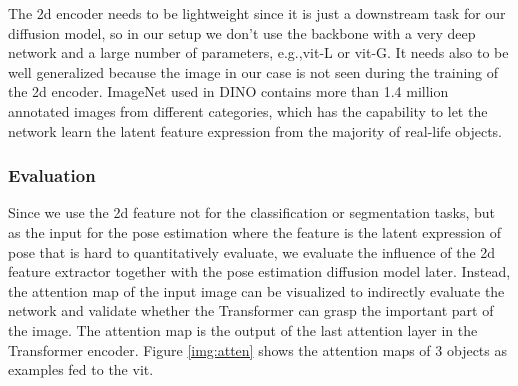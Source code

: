 \documentclass[12pt,DIV14,BCOR12mm,a4paper,footinclude=false,headinclude,parskip=half-,twoside,openright,cleardoublepage=empty,toc=index,bibliography=totoc,listof=totoc]{scrreprt}
\numberwithin{equation}{chapter}
\begin{document}
The \gls{2d} encoder needs to be lightweight since it is just a downstream task for our diffusion model, so in our setup we don't use the backbone with a very deep network and a large number of parameters, e.g.,\gls{vit}-L or \gls{vit}-G. It needs also to be well generalized because the image in our case is not seen during the training of the \gls{2d} encoder. ImageNet used in DINO contains more than 1.4 million annotated images from different categories, which has the capability to let the network learn the latent feature expression from the majority of real-life objects. 

\subsubsection{Evaluation}
Since we use the \gls{2d} feature not for the classification or segmentation tasks, but as the input for the pose estimation where the feature is the latent expression of pose that is hard to quantitatively evaluate, we evaluate the influence of the \gls{2d} feature extractor together with the pose estimation diffusion model later. Instead, the attention map of the input image can be visualized to indirectly evaluate the network and validate whether the Transformer can grasp the important part of the image. The attention map is the output of the last attention layer in the Transformer encoder. Figure \ref{img:atten} shows the attention maps of 3 objects as examples fed to the \gls{vit}.
\end{document}
